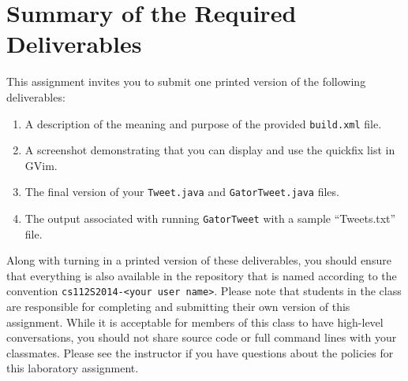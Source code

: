 \section*{Summary of the Required Deliverables}

  This assignment invites you to submit one printed version of the following deliverables: 

  \begin{enumerate}
    \item A description of the meaning and purpose of the provided {\tt build.xml} file.
    \item A screenshot demonstrating that you can display and use the quickfix list in GVim.
    \item The final version of your {\tt Tweet.java} and {\tt GatorTweet.java} files.
    \item The output associated with running {\tt GatorTweet} with a sample ``Tweets.txt'' file.
  \end{enumerate}

  Along with turning in a printed version of these deliverables, you should ensure that everything is also available in the
  repository that is named according to the convention {\tt cs112S2014-<your user name>}. Please note that students in the class
  are responsible for completing and submitting their own version of this assignment.    While it is acceptable for members of
  this class to have high-level conversations, you should not share source code or full command lines with your classmates.
  Please see the instructor if you have questions about the policies for this laboratory assignment.

  
